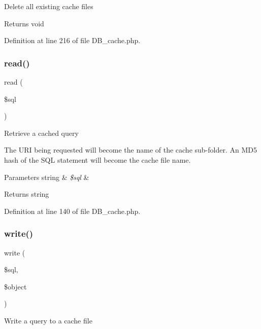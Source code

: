Delete all existing cache files

\begin{DoxyReturn}{Returns}
void 
\end{DoxyReturn}


Definition at line 216 of file D\+B\+\_\+cache.\+php.

\mbox{\label{class_c_i___d_b___cache_a6e421e93555105d187d7e6ba4c84521b}} 
\subsubsection{\texorpdfstring{read()}{read()}}
{\footnotesize\ttfamily read (\begin{DoxyParamCaption}\item[{}]{\$sql }\end{DoxyParamCaption})}

Retrieve a cached query

The U\+RI being requested will become the name of the cache sub-\/folder. An M\+D5 hash of the S\+QL statement will become the cache file name.


\begin{DoxyParams}[1]{Parameters}
string & {\em \$sql} & \\
\hline
\end{DoxyParams}
\begin{DoxyReturn}{Returns}
string 
\end{DoxyReturn}


Definition at line 140 of file D\+B\+\_\+cache.\+php.

\mbox{\label{class_c_i___d_b___cache_a483ea50183465928c931aa17b4f4b5b8}} 
\subsubsection{\texorpdfstring{write()}{write()}}
{\footnotesize\ttfamily write (\begin{DoxyParamCaption}\item[{}]{\$sql,  }\item[{}]{\$object }\end{DoxyParamCaption})}

Write a query to a cache file


